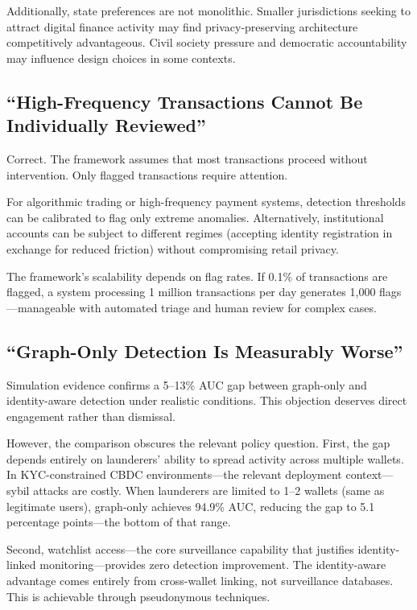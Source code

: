 \documentclass[11pt]{article}
\begin{document}
Additionally, state preferences are not monolithic. Smaller jurisdictions seeking to attract digital finance activity may find privacy-preserving architecture competitively advantageous. Civil society pressure and democratic accountability may influence design choices in some contexts.

\subsection{``High-Frequency Transactions Cannot Be Individually Reviewed''}

Correct. The framework assumes that most transactions proceed without intervention. Only flagged transactions require attention.

For algorithmic trading or high-frequency payment systems, detection thresholds can be calibrated to flag only extreme anomalies. Alternatively, institutional accounts can be subject to different regimes (accepting identity registration in exchange for reduced friction) without compromising retail privacy.

The framework's scalability depends on flag rates. If 0.1\% of transactions are flagged, a system processing 1 million transactions per day generates 1,000 flags---manageable with automated triage and human review for complex cases.

\subsection{``Graph-Only Detection Is Measurably Worse''}

Simulation evidence confirms a 5--13\% AUC gap between graph-only and identity-aware detection under realistic conditions. This objection deserves direct engagement rather than dismissal.

However, the comparison obscures the relevant policy question. First, the gap depends entirely on launderers' ability to spread activity across multiple wallets. In KYC-constrained CBDC environments---the relevant deployment context---sybil attacks are costly. When launderers are limited to 1--2 wallets (same as legitimate users), graph-only achieves 94.9\% AUC, reducing the gap to 5.1 percentage points---the bottom of that range.

Second, watchlist access---the core surveillance capability that justifies identity-linked monitoring---provides zero detection improvement. The identity-aware advantage comes entirely from cross-wallet linking, not surveillance databases. This is achievable through pseudonymous techniques.
\end{document}
